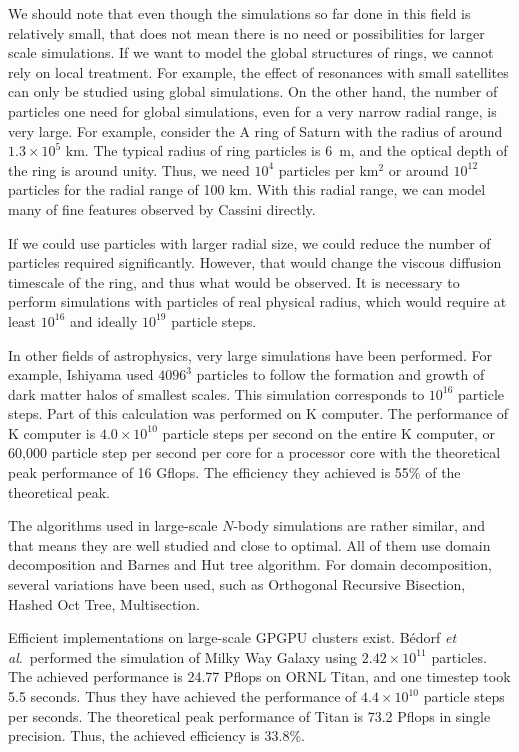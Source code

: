 \documentclass[conference]{IEEEtran}
\begin{document}
We should note that even though the simulations so far done in this
field is relatively small, that does not mean there is no need or
possibilities for larger scale simulations. If we want to model the
global structures of rings, we cannot rely on local treatment. For
example, the effect of resonances with small satellites can only be
studied using global simulations. On the other hand, the number of
particles one need for global simulations, even  for a very narrow
radial range, is very large. For example, consider the A ring of Saturn
with the radius of around $1.3\times 10^5$ km. The typical radius
of ring particles is 6~m\cite{ZEBKER1985531}, and the optical depth of
the ring is around unity. Thus, we need $10^4$ particles per km$^2$ 
or around $10^{12}$ particles for the radial range of 100
km. With this radial range, we can model many of fine features observed
by Cassini directly.

If we could use particles with larger radial size, we could reduce the number
of particles required significantly. However, that would change the
viscous diffusion timescale of the ring, and thus what would be
observed. It is necessary to perform
simulations with particles of real physical radius, which would require
at least $10^{16}$ and ideally $10^{19}$ particle steps.

In other fields of astrophysics, very large simulations have been
performed. For example, Ishiyama\cite{Ishiyama2014} used $4096^3$
particles to follow the formation and growth of dark matter halos of
smallest scales. This simulation corresponds to  $10^{16}$ particle
steps. Part of this calculation was performed on K computer. The
performance of K computer is $4.0\times 10^{10}$ particle steps per
second on the entire K computer, or 60,000 particle step per second
per core for a processor core with the theoretical peak performance of
16 Gflops\cite{Ishiyamaetal2012}. The efficiency they achieved is 55\%
of the theoretical peak. 


The algorithms used in large-scale $N$-body simulations are rather
similar, and that means they are well studied and close to optimal.
 All of them use domain
decomposition and Barnes and Hut tree algorithm. For domain
decomposition, several variations have been used, such as
Orthogonal Recursive Bisection\cite{Salmon1990}, Hashed Oct
Tree\cite{WarrenSalmon1992}, Multisection\cite{Makino2004}.


Efficient implementations on large-scale GPGPU clusters
exist\cite{Hamadaetal2009, PortegiesZwartetal2014, Bedorfetal2014}.
B{\'e}dorf {\it et al}.~performed the simulation of Milky Way Galaxy
using $2.42 \times 10^{11}$ particles. The achieved performance is
24.77 Pflops on ORNL Titan, and one timestep took 5.5 seconds. Thus
they have achieved the performance of $4.4 \times 10^{10}$ particle
steps per seconds. The theoretical peak performance of Titan is 73.2
Pflops in single precision. Thus, the achieved efficiency is 33.8\%.
\end{document}
